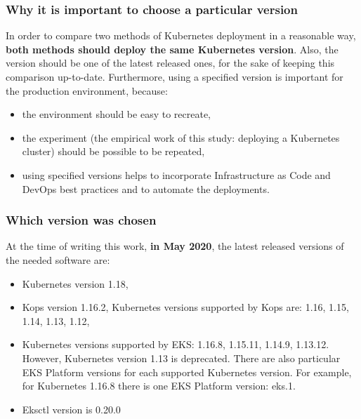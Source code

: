 \subsubsection{Why it is important to choose a particular version}
In order to compare two methods of Kubernetes deployment in a reasonable way, \textbf{both methods should deploy the same Kubernetes version}. Also, the version should be one of the latest released ones, for the sake of keeping this comparison up-to-date. Furthermore, using a specified version is important for the production environment, because:
\begin{itemize}
\item the environment should be easy to recreate,
\item the experiment (the empirical work of this study: deploying a Kubernetes cluster) should be possible to be repeated,
\item using specified versions helps to incorporate Infrastructure as Code and DevOps best practices and to automate the deployments.
\end{itemize}

\subsubsection{Which version was chosen}
At the time of writing this work, \textbf{in May 2020}, the latest released versions of the needed software are:
\begin{itemize}
\item Kubernetes version 1.18\cite{online-k8s-blog-latest},
\item Kops version 1.16.2, Kubernetes versions supported by Kops are: 1.16, 1.15, 1.14, 1.13, 1.12\cite{online-kops-versions}\cite{kops-releases},
\item Kubernetes versions supported by EKS: 1.16.8, 1.15.11, 1.14.9, 1.13.12. However, Kubernetes version 1.13 is deprecated\cite{online-eks-versions}. There are also particular EKS Platform versions for each supported Kubernetes version. For example, for Kubernetes 1.16.8 there is one EKS Platform version: eks.1\cite{online-eks-platform-versions}.
\item Eksctl version is 0.20.0\cite{online-eksctl-versions}
\end{itemize}

